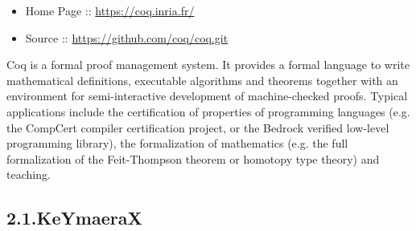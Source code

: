 \documentclass[12pt,twoside]{article}
\begin{document}
\begin{itemize}[noitemsep,topsep=\mdcompacttopsep]%

\item{}Home Page :: \href{https://coq.inria.fr/}{{\ttfamily https://\hspace{0pt}coq.\hspace{0pt}inria.\hspace{0pt}fr/\hspace{0pt}}}%

\item{}Source :: \href{https://github.com/coq/coq.git}{{\ttfamily https://\hspace{0pt}github.\hspace{0pt}com/\hspace{0pt}coq/\hspace{0pt}coq.\hspace{0pt}git}}%
\end{itemize}%

\noindent{}Coq is a formal proof management system. It provides a formal language
to write mathematical definitions, executable algorithms and theorems
together with an environment for semi-interactive development of
machine-checked proofs. Typical applications include the certification
of properties of programming languages (e.g. the CompCert compiler
certification project, or the Bedrock verified low-level programming
library), the formalization of mathematics (e.g. the full
formalization of the Feit-Thompson theorem or homotopy type theory)
and teaching.%

\subsection{2.1.\hspace*{0.5em}KeYmaeraX}\label{sec-keymaerax}%
\end{document}

